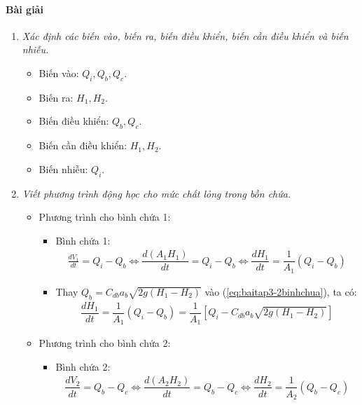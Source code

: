 \paragraph{Bài giải}
    \begin{enumerate}[\it a.]
        \item \textit{Xác định các biến vào, biến ra, biến điều khiển, biến cần điều khiển và biến nhiễu.}
            \begin{itemize}
                \item Biến vào: $Q_i, Q_b, Q_c$.
                \item Biến ra: $H_1, H_2$.
                \item Biến điều khiển: $Q_b, Q_c$.
                \item Biến cần điều khiển: $H_1, H_2$.
                \item Biến nhiễu: $Q_i$.
            \end{itemize}

        \item \textit{Viết phương trình động học cho mức chất lỏng trong bồn chứa.}
            \begin{itemize}
                \item Phương trình cho bình chứa 1:
                    \begin{itemize}
                        \item Bình chứa 1:
                            \begin{align} \label{eq:baitap3-2binhchua}
                                \frac{dV_1}{dt} = Q_i - Q_b \Longleftrightarrow \dfrac{d\left({A_1 H_1}\right)}{dt} = Q_i - Q_b \Longleftrightarrow \dfrac{dH_1}{dt} = \dfrac{1}{A_1} \left({Q_i - Q_b}\right)
                            \end{align}

                        \item Thay $Q_b = C_{db}a_b\sqrt{2g(H_1 - H_2)}$ vào (\ref{eq:baitap3-2binhchua}), ta có:
                            \begin{align}
                                \dfrac{dH_1}{dt} = \dfrac{1}{A_1} \left({Q_i - Q_b}\right) = \dfrac{1}{A_1} \left[{Q_i - C_{db}a_b\sqrt{2g(H_1 - H_2)}}\right]
                            \end{align}
                    \end{itemize}

                \item Phương trình cho bình chứa 2:
                    \begin{itemize}
                        \item Bình chứa 2:
                            \begin{align} \label{eq:baitap3-2binhchua-2}
                                \dfrac{dV_2}{dt} = Q_b - Q_c \Longleftrightarrow \dfrac{d\left({A_2 H_2}\right)}{dt} = Q_b - Q_c \Longleftrightarrow \dfrac{dH_2}{dt} = \dfrac{1}{A_2} \left({Q_b - Q_c}\right)
                            \end{align}


\end{itemize}
\end{itemize}
\end{enumerate}
